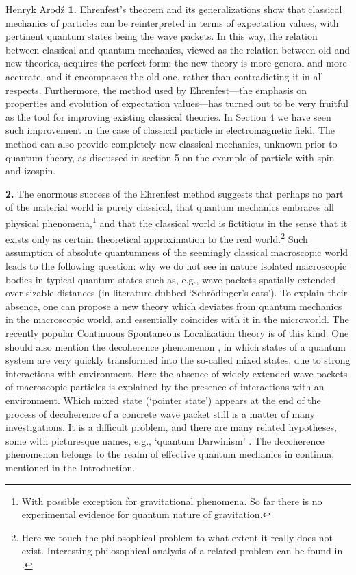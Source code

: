 \begin{artengenv}{Henryk Arod\'z}
{\bf 1.} Ehrenfest's theorem and its generalizations show that classical mechanics of particles can be reinterpreted in terms of expectation values, with pertinent quantum states being the wave packets. In this way, the relation between classical and quantum mechanics, viewed as the relation between old and new theories, acquires the perfect form: the new theory is more general and more accurate, and it
encompasses the old one, rather than contradicting
it in all respects. Furthermore, the method used by Ehrenfest---the emphasis on properties and evolution of expectation values---has turned out to be very fruitful as the tool for improving existing classical theories. In Section 4 we have seen such improvement in the case of classical particle in electromagnetic field. The method can also provide completely new classical mechanics, unknown prior to quantum theory, as discussed in section 5 on the example of particle with spin and izospin. 




{\bf 2.} The enormous success of the Ehrenfest method suggests that perhaps no part of the material world is purely classical, that quantum mechanics embraces all physical phenomena,\footnote{With possible exception for gravitational phenomena. So far there is no experimental evidence for quantum nature of gravitation.} and that the classical world is fictitious in the sense that it exists only as certain theoretical approximation to the real world.\footnote{Here we touch the philosophical problem to what extent it really does not exist. Interesting philosophical analysis of a related problem can be found in \parencite{heller}.}
 Such assumption of absolute quantumness of the seemingly classical macroscopic world leads to the following question: why we do not see in nature isolated macroscopic bodies in typical quantum states such as, e.g., wave packets spatially extended over sizable distances (in literature dubbed `Schr\"odinger's cats'). To explain their absence, one can propose a new theory which deviates from quantum mechanics in the macroscopic world, and essentially coincides with it in the microworld. The recently popular Continuous Spontaneous Localization theory \parencite{CSL} is of this kind. 
 One should also mention 
the decoherence phenomenon \parencite{zeh,zurek}, in which states of a quantum system are very quickly transformed into the so-called mixed states, due to strong interactions with environment. Here the absence of widely extended wave packets of macroscopic particles is explained by the presence of interactions with an environment. Which mixed state (`pointer state') appears at the end of the process of decoherence of a concrete wave packet still is a matter of many investigations. It is a difficult problem, and there are many related hypotheses, some with picturesque names, e.g., `quantum Darwinism' \parencite{zurek2}. The decoherence phenomenon belongs to the realm of effective quantum mechanics in continua, mentioned in the Introduction. 



\end{artengenv}
